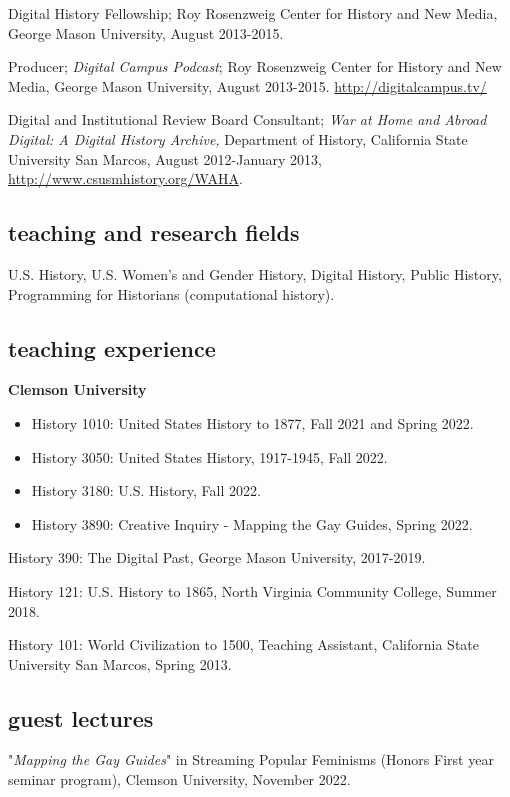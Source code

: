 \documentclass[11pt]{article}
\begin{document}
Digital History Fellowship; Roy Rosenzweig Center for History and New Media, George Mason University, August 2013-2015.

Producer; \emph{Digital Campus Podcast}; Roy Rosenzweig Center for History and New Media, George Mason University, August 2013-2015. \url{http://digitalcampus.tv/}

Digital and Institutional Review Board Consultant; \emph{War at Home and Abroad Digital: A Digital History Archive,} Department of History, California State University San Marcos, August 2012-January 2013, \url{http://www.csusmhistory.org/WAHA}.

\subsection{teaching and research fields}
U.S. History, U.S. Women's and Gender History, Digital History, Public History, Programming for Historians (computational history).

\subsection{teaching experience}

\textbf{Clemson University}
\begin{itemize}
  \item History 1010: United States History to 1877, Fall 2021 and Spring 2022.
  \item History 3050: United States History, 1917-1945, Fall 2022.
  \item History 3180: U.S. History, Fall 2022. 
  \item History 3890: Creative Inquiry - Mapping the Gay Guides, Spring 2022.
\end{itemize}
 
History 390: The Digital Past, George Mason University, 2017-2019.

History 121: U.S. History to 1865, North Virginia Community College, Summer 2018.

History 101: World Civilization to 1500, Teaching Assistant, California State University San Marcos, Spring 2013.

\subsection{guest lectures}
"\emph{Mapping the Gay Guides}" in Streaming Popular Feminisms (Honors First year seminar program), Clemson University, November 2022. 
\end{document}
